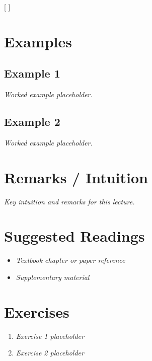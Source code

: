 \documentclass[
  letterpaper,
  DIV=11,
  numbers=noendperiod]{scrartcl}
\providecommand{\tightlist}{%
  \setlength{\itemsep}{0pt}\setlength{\parskip}{0pt}}
\begin{document}
{[}  {]}

\section{Examples}\label{examples}

\subsection{Example 1}\label{example-1}

\emph{Worked example placeholder.}

\subsection{Example 2}\label{example-2}

\emph{Worked example placeholder.}

\section{Remarks / Intuition}\label{remarks-intuition}

\begin{tcolorbox}[enhanced jigsaw, opacitybacktitle=0.6, arc=.35mm, breakable, colbacktitle=quarto-callout-note-color!10!white, left=2mm, coltitle=black, colframe=quarto-callout-note-color-frame, leftrule=.75mm, titlerule=0mm, bottomrule=.15mm, bottomtitle=1mm, colback=white, toptitle=1mm, toprule=.15mm, title=\textcolor{quarto-callout-note-color}{\faInfo}\hspace{0.5em}{Note}, rightrule=.15mm, opacityback=0]

\emph{Key intuition and remarks for this lecture.}

\end{tcolorbox}

\section{Suggested Readings}\label{suggested-readings}

\begin{itemize}
\tightlist
\item
  \emph{Textbook chapter or paper reference}
\item
  \emph{Supplementary material}
\end{itemize}

\section{Exercises}\label{exercises}

\begin{enumerate}
\def\labelenumi{\arabic{enumi}.}
\tightlist
\item
  \emph{Exercise 1 placeholder}
\item
  \emph{Exercise 2 placeholder}
\end{enumerate}
\end{document}
